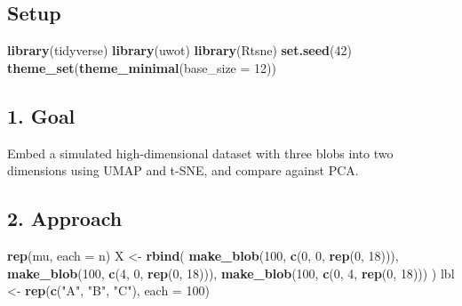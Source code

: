 \documentclass[
]{article}
\newenvironment{Shaded}{\begin{snugshade}}{\end{snugshade}}
\newcommand{\AttributeTok}[1]{\textcolor[rgb]{0.13,0.29,0.53}{#1}}
\newcommand{\DecValTok}[1]{\textcolor[rgb]{0.00,0.00,0.81}{#1}}
\newcommand{\FunctionTok}[1]{\textcolor[rgb]{0.13,0.29,0.53}{\textbf{#1}}}
\newcommand{\NormalTok}[1]{#1}
\newcommand{\OtherTok}[1]{\textcolor[rgb]{0.56,0.35,0.01}{#1}}
\newcommand{\StringTok}[1]{\textcolor[rgb]{0.31,0.60,0.02}{#1}}
\begin{document}
\subsection{Setup}\label{setup}

\begin{Shaded}
\begin{Highlighting}[]
\FunctionTok{library}\NormalTok{(tidyverse)}
\FunctionTok{library}\NormalTok{(uwot)}
\FunctionTok{library}\NormalTok{(Rtsne)}
\FunctionTok{set.seed}\NormalTok{(}\DecValTok{42}\NormalTok{)}
\FunctionTok{theme\_set}\NormalTok{(}\FunctionTok{theme\_minimal}\NormalTok{(}\AttributeTok{base\_size =} \DecValTok{12}\NormalTok{))}
\end{Highlighting}
\end{Shaded}

\subsection{1. Goal}\label{goal}

Embed a simulated high-dimensional dataset with three blobs into two
dimensions using UMAP and t-SNE, and compare against PCA.

\subsection{2. Approach}\label{approach}

\begin{Shaded}
\begin{Highlighting}[]
  \FunctionTok{rep}\NormalTok{(mu, }\AttributeTok{each =}\NormalTok{ n)}
\NormalTok{X }\OtherTok{\textless{}{-}} \FunctionTok{rbind}\NormalTok{(}
  \FunctionTok{make\_blob}\NormalTok{(}\DecValTok{100}\NormalTok{, }\FunctionTok{c}\NormalTok{(}\DecValTok{0}\NormalTok{, }\DecValTok{0}\NormalTok{, }\FunctionTok{rep}\NormalTok{(}\DecValTok{0}\NormalTok{, }\DecValTok{18}\NormalTok{))),}
  \FunctionTok{make\_blob}\NormalTok{(}\DecValTok{100}\NormalTok{, }\FunctionTok{c}\NormalTok{(}\DecValTok{4}\NormalTok{, }\DecValTok{0}\NormalTok{, }\FunctionTok{rep}\NormalTok{(}\DecValTok{0}\NormalTok{, }\DecValTok{18}\NormalTok{))),}
  \FunctionTok{make\_blob}\NormalTok{(}\DecValTok{100}\NormalTok{, }\FunctionTok{c}\NormalTok{(}\DecValTok{0}\NormalTok{, }\DecValTok{4}\NormalTok{, }\FunctionTok{rep}\NormalTok{(}\DecValTok{0}\NormalTok{, }\DecValTok{18}\NormalTok{)))}
\NormalTok{)}
\NormalTok{lbl }\OtherTok{\textless{}{-}} \FunctionTok{rep}\NormalTok{(}\FunctionTok{c}\NormalTok{(}\StringTok{"A"}\NormalTok{, }\StringTok{"B"}\NormalTok{, }\StringTok{"C"}\NormalTok{), }\AttributeTok{each =} \DecValTok{100}\NormalTok{)}
\end{Highlighting}
\end{Shaded}
\end{document}
